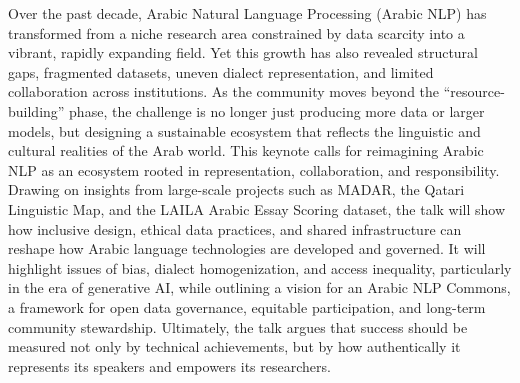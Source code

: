 Over the past decade, Arabic Natural Language Processing (Arabic NLP) has transformed from a niche research area constrained by data scarcity into a vibrant, rapidly expanding field. Yet this growth has also revealed structural gaps, fragmented datasets, uneven dialect representation, and limited collaboration across institutions. As the community moves beyond the “resource-building” phase, the challenge is no longer just producing more data or larger models, but designing a sustainable ecosystem that reflects the linguistic and cultural realities of the Arab world. This keynote calls for reimagining Arabic NLP as an ecosystem rooted in representation, collaboration, and responsibility. Drawing on insights from large-scale projects such as MADAR, the Qatari Linguistic Map, and the LAILA Arabic Essay Scoring dataset, the talk will show how inclusive design, ethical data practices, and shared infrastructure can reshape how Arabic language technologies are developed and governed. It will highlight issues of bias, dialect homogenization, and access inequality, particularly in the era of generative AI, while outlining a vision for an Arabic NLP Commons, a framework for open data governance, equitable participation, and long-term community stewardship. Ultimately, the talk argues that success should be measured not only by technical achievements, but by how authentically it represents its speakers and empowers its researchers.

